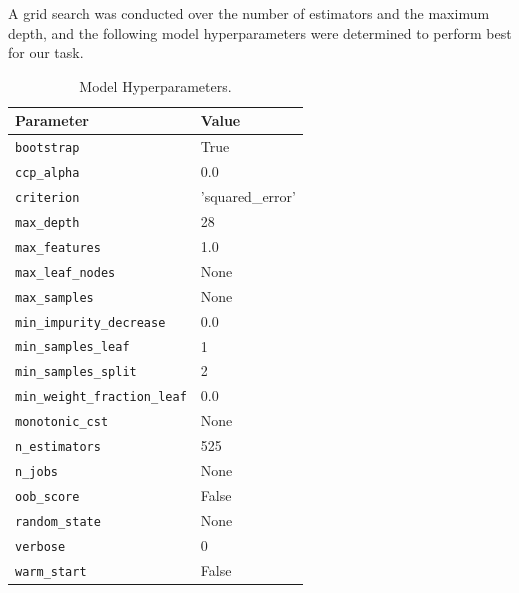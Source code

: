 A grid search was conducted over the number of estimators and the maximum depth, and the following model hyperparameters were determined to perform best for our task. 
\par
\begin{table}[h!]
\centering
\renewcommand{\arraystretch}{1.1} %
\setlength{\tabcolsep}{8pt}       %
\begin{tabular}{|l|l|}
\hline
\textbf{Parameter}                 & \textbf{Value}             \\ \hline
\texttt{bootstrap}                 & True                       \\ \hline
\texttt{ccp\_alpha}                & 0.0                        \\ \hline
\texttt{criterion}                 & 'squared\_error'           \\ \hline
\texttt{max\_depth}                & 28                         \\ \hline
\texttt{max\_features}             & 1.0                        \\ \hline
\texttt{max\_leaf\_nodes}          & None                       \\ \hline
\texttt{max\_samples}              & None                       \\ \hline
\texttt{min\_impurity\_decrease}   & 0.0                        \\ \hline
\texttt{min\_samples\_leaf}        & 1                          \\ \hline
\texttt{min\_samples\_split}       & 2                          \\ \hline
\texttt{min\_weight\_fraction\_leaf} & 0.0                      \\ \hline
\texttt{monotonic\_cst}            & None                       \\ \hline
\texttt{n\_estimators}             & 525                        \\ \hline
\texttt{n\_jobs}                   & None                       \\ \hline
\texttt{oob\_score}                & False                      \\ \hline
\texttt{random\_state}             & None                       \\ \hline
\texttt{verbose}                   & 0                          \\ \hline
\texttt{warm\_start}               & False                      \\ \hline
\end{tabular}
\caption{Model Hyperparameters.}
\label{tab:model_hyperparameters}
\end{table}
\par

